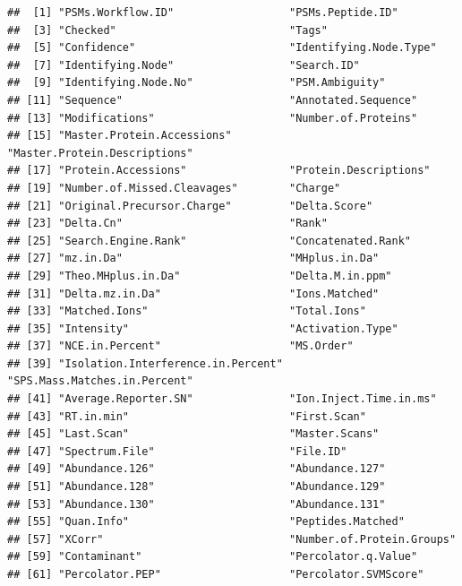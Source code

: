 \documentclass[9pt,a4paper,]{extarticle}
\begin{document}
\begin{verbatim}
##  [1] "PSMs.Workflow.ID"                  "PSMs.Peptide.ID"                  
##  [3] "Checked"                           "Tags"                             
##  [5] "Confidence"                        "Identifying.Node.Type"            
##  [7] "Identifying.Node"                  "Search.ID"                        
##  [9] "Identifying.Node.No"               "PSM.Ambiguity"                    
## [11] "Sequence"                          "Annotated.Sequence"               
## [13] "Modifications"                     "Number.of.Proteins"               
## [15] "Master.Protein.Accessions"         "Master.Protein.Descriptions"      
## [17] "Protein.Accessions"                "Protein.Descriptions"             
## [19] "Number.of.Missed.Cleavages"        "Charge"                           
## [21] "Original.Precursor.Charge"         "Delta.Score"                      
## [23] "Delta.Cn"                          "Rank"                             
## [25] "Search.Engine.Rank"                "Concatenated.Rank"                
## [27] "mz.in.Da"                          "MHplus.in.Da"                     
## [29] "Theo.MHplus.in.Da"                 "Delta.M.in.ppm"                   
## [31] "Delta.mz.in.Da"                    "Ions.Matched"                     
## [33] "Matched.Ions"                      "Total.Ions"                       
## [35] "Intensity"                         "Activation.Type"                  
## [37] "NCE.in.Percent"                    "MS.Order"                         
## [39] "Isolation.Interference.in.Percent" "SPS.Mass.Matches.in.Percent"      
## [41] "Average.Reporter.SN"               "Ion.Inject.Time.in.ms"            
## [43] "RT.in.min"                         "First.Scan"                       
## [45] "Last.Scan"                         "Master.Scans"                     
## [47] "Spectrum.File"                     "File.ID"                          
## [49] "Abundance.126"                     "Abundance.127"                    
## [51] "Abundance.128"                     "Abundance.129"                    
## [53] "Abundance.130"                     "Abundance.131"                    
## [55] "Quan.Info"                         "Peptides.Matched"                 
## [57] "XCorr"                             "Number.of.Protein.Groups"         
## [59] "Contaminant"                       "Percolator.q.Value"               
## [61] "Percolator.PEP"                    "Percolator.SVMScore"
\end{verbatim}
\end{document}
